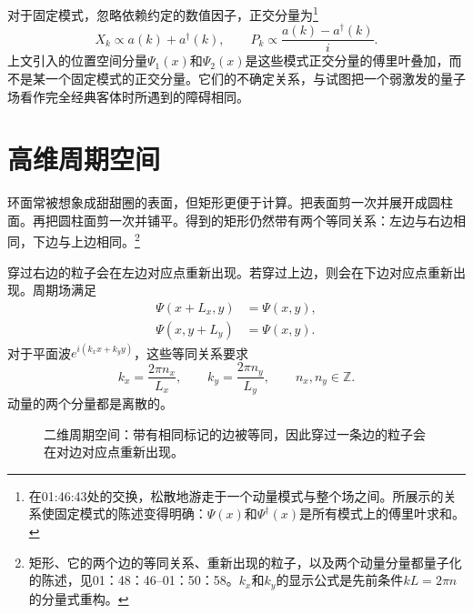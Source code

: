 对于固定模式，忽略依赖约定的数值因子，正交分量为\footnote{在01:46:43处的交换，松散地游走于一个动量模式与整个场之间。所展示的关系使固定模式的陈述变得明确：\(\Psi(x)\)和\(\Psi^\dagger(x)\)是所有模式上的傅里叶求和。}
\begin{equation}
X_k\propto a(k)+a^\dagger(k),
\qquad
P_k\propto \frac{a(k)-a^\dagger(k)}{i}.
\end{equation}
上文引入的位置空间分量\(\Psi_1(x)\)和\(\Psi_2(x)\)是这些模式正交分量的傅里叶叠加，而不是某一个固定模式的正交分量。它们的不确定关系，与试图把一个弱激发的量子场看作完全经典客体时所遇到的障碍相同。

\section{高维周期空间}

\begin{classroomqa}
\end{classroomqa}

环面常被想象成甜甜圈的表面，但矩形更便于计算。把表面剪一次并展开成圆柱面。再把圆柱面剪一次并铺平。得到的矩形仍然带有两个等同关系：左边与右边相同，下边与上边相同。\footnote{矩形、它的两个边的等同关系、重新出现的粒子，以及两个动量分量都量子化的陈述，见01：48：46--01：50：58。\(k_x\)和\(k_y\)的显示公式是先前条件\(kL=2\pi n\)的分量式重构。}

穿过右边的粒子会在左边对应点重新出现。若穿过上边，则会在下边对应点重新出现。周期场满足
\begin{align}
\Psi(x+L_x,y)&=\Psi(x,y),\\
\Psi(x,y+L_y)&=\Psi(x,y).
\end{align}
对于平面波\(e^{i(k_x x+k_y y)}\)，这些等同关系要求
\begin{equation}
k_x=\frac{2\pi n_x}{L_x},
\qquad
k_y=\frac{2\pi n_y}{L_y},
\qquad
n_x,n_y\in\mathbb Z.
\end{equation}
动量的两个分量都是离散的。

\begin{figure}[t]
\centering
{}
\caption{二维周期空间：带有相同标记的边被等同，因此穿过一条边的粒子会在对边对应点重新出现。}
\end{figure}

